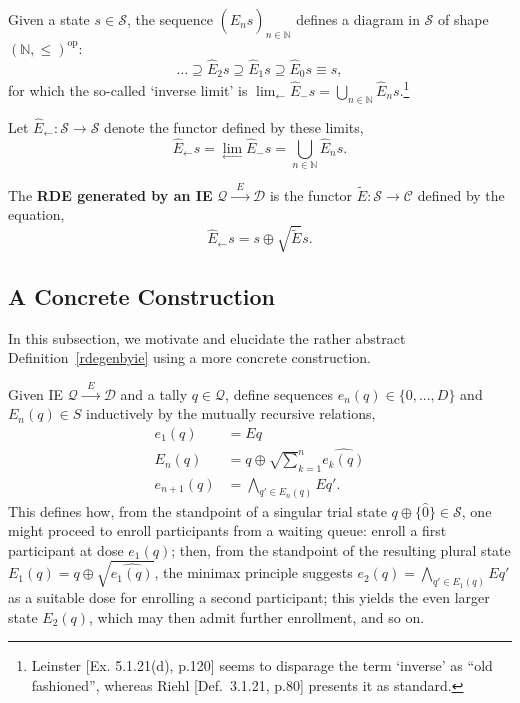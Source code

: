 \documentclass{article}
\newcommand{\N}{\mathbb{N}}
\renewcommand{\S}{\ensuremath{\mathcal{S}}} %
\newcommand{\A}{\ensuremath{\mathcal{A}}}
\newcommand{\C}{\ensuremath{\mathcal{C}}}
\newcommand{\D}{\ensuremath{\mathcal{D}}}
\newcommand{\Q}{\ensuremath{\mathcal{Q}}}
\newcommand{\IE}{\ensuremath{\Q \xrightarrow{\;\;E\;\;} \D}}
\newcommand{\E}{\ensuremath{\widehat{E}}}
\DeclareMathOperator{\dual}{op}
\begin{document}
\begin{fact}
  Given a state $s \in \S$, the sequence $(\E_n s)_{n\in\N}$ defines a diagram in $\S$ of shape $(\N,\le)^{\dual}$:
  $$
  \dots \supseteq \E_2s \supseteq \E_1s \supseteq \E_0s\equiv s,
  $$
for which the so-called `inverse limit' is $\displaystyle{\lim_{\longleftarrow} \E_{-} s} = \bigcup_{n\in\N} \E_n s$.\footnote{Leinster [Ex. 5.1.21(d), p.120] seems to disparage the term `inverse' as ``old fashioned'', whereas Riehl [Def.~3.1.21, p.80] presents it as standard.}
\end{fact}

\begin{nota}
  Let $\E_\leftarrow : \S \rightarrow \S$ denote the functor defined by these limits,
  $$
  \E_\leftarrow s = \displaystyle{\lim_{\longleftarrow} \E_{-} s} = \bigcup_{n\in\N} \E_n s.
  $$
\end{nota}

\begin{defn}\label{rdegenbyie}
  The \textbf{RDE generated by an IE} $\IE$ is the functor $\widetilde{E} : \S \rightarrow \C$ defined by the equation,
  $$
  \E_\leftarrow s = s \oplus \surd\widetilde{E} s.
  $$
  \begin{center}
  \end{center}
\end{defn}

\subsection{A Concrete Construction}

In this subsection, we motivate and elucidate the rather abstract Definition~\ref{rdegenbyie} using a more concrete construction.

\begin{nota}\label{mutrec}
  Given IE $\Q \xrightarrow{\;\;E\;\;} \D$ and a tally $q \in \Q$, define sequences $e_n(q) \in \{0,...,D\}$ and $E_n(q) \in S$ inductively by the mutually recursive relations,
  $$
  \begin{aligned}
    e_1(q) &= E q \\
    E_n(q) &= q \oplus \surd \sum_{k=1}^n \widehat{e_k(q)} \\
    e_{n+1}(q) &= \bigwedge_{q' \in E_n(q)} E q'.
  \end{aligned}
  $$
This defines how, from the standpoint of a singular trial state $q \oplus \{\widehat{0}\} \in \S$, one might proceed to enroll participants from a waiting queue: enroll a first participant at dose $e_1(q)$; then, from the standpoint of the resulting plural state $E_1(q) = q \oplus \surd\widehat{e_1(q)}$, the minimax principle suggests $e_2(q) = \bigwedge_{q' \in E_1(q)} E q'$ as a suitable dose for enrolling a second participant; this yields the even larger state $E_2(q)$, which may then admit further enrollment, and so on.
\end{nota}
\end{document}
